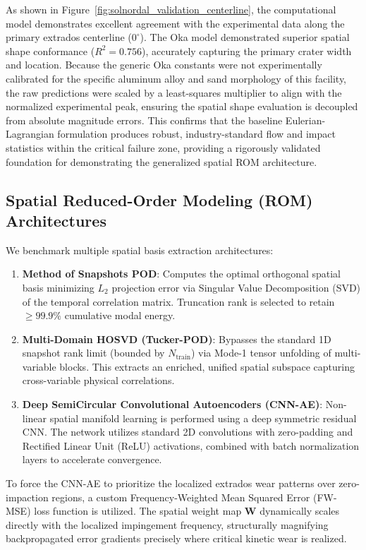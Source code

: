 \documentclass{article}
\newcommand{\mat}[1]{\mathbf{#1}}
\begin{document}
As shown in Figure~\ref{fig:solnordal_validation_centerline}, the computational model demonstrates excellent agreement with the experimental data along the primary extrados centerline ($0^\circ$). The Oka model demonstrated superior spatial shape conformance ($R^2 = 0.756$), accurately capturing the primary crater width and location. Because the generic Oka constants were not experimentally calibrated for the specific aluminum alloy and sand morphology of this facility, the raw predictions were scaled by a least-squares multiplier to align with the normalized experimental peak, ensuring the spatial shape evaluation is decoupled from absolute magnitude errors. This confirms that the baseline Eulerian-Lagrangian formulation produces robust, industry-standard flow and impact statistics within the critical failure zone, providing a rigorously validated foundation for demonstrating the generalized spatial ROM architecture.


\subsection{Spatial Reduced-Order Modeling (ROM) Architectures}
We benchmark multiple spatial basis extraction architectures:

\begin{enumerate}
    \item \textbf{Method of Snapshots POD}: Computes the optimal orthogonal spatial basis minimizing $L_2$ projection error via Singular Value Decomposition (SVD) of the temporal correlation matrix. Truncation rank is selected to retain $\ge 99.9\%$ cumulative modal energy.
    \item \textbf{Multi-Domain HOSVD (Tucker-POD)}: Bypasses the standard 1D snapshot rank limit (bounded by $N_{\text{train}}$) via Mode-1 tensor unfolding of multi-variable blocks. This extracts an enriched, unified spatial subspace capturing cross-variable physical correlations.
    \item \textbf{Deep SemiCircular Convolutional Autoencoders (CNN-AE)}: Non-linear spatial manifold learning is performed using a deep symmetric residual CNN. The network utilizes standard 2D convolutions with zero-padding and Rectified Linear Unit (ReLU) activations, combined with batch normalization layers to accelerate convergence.
\end{enumerate}

To force the CNN-AE to prioritize the localized extrados wear patterns over zero-impaction regions, a custom Frequency-Weighted Mean Squared Error (FW-MSE) loss function is utilized. The spatial weight map $\mat{W}$ dynamically scales directly with the localized impingement frequency, structurally magnifying backpropagated error gradients precisely where critical kinetic wear is realized.
\end{document}
